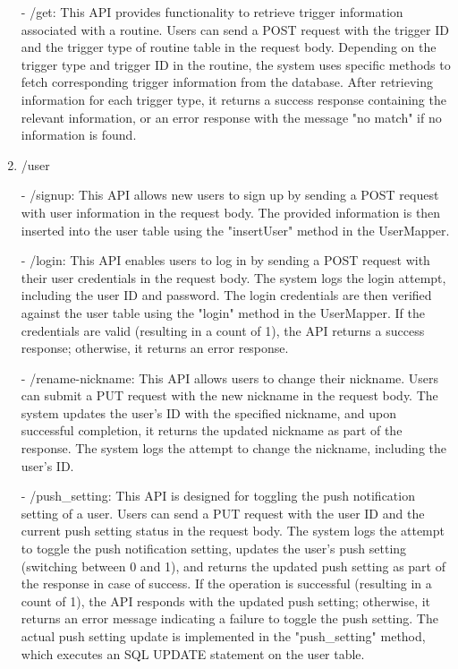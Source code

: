 \begin{enumerate}
                        \item[-] /get: This API provides functionality to retrieve trigger information associated with a routine. Users can send a POST request with the trigger ID and the trigger type of routine table in the request body. Depending on the trigger type and trigger ID in the routine, the system uses specific methods to fetch corresponding trigger information from the database. After retrieving information for each trigger type, it returns a success response containing the relevant information, or an error response with the message "no match" if no information is found.\\

                        \item /user
                        \item[-] /signup: This API allows new users to sign up by sending a POST request with user information in the request body. The provided information is then inserted into the user table using the "insertUser" method in the UserMapper.\\
                        \item[-] /login: This API enables users to log in by sending a POST request with their user credentials in the request body. The system logs the login attempt, including the user ID and password. The login credentials are then verified against the user table using the "login" method in the UserMapper. If the credentials are valid (resulting in a count of 1), the API returns a success response; otherwise, it returns an error response.\\
                        \item[-] /rename-nickname: This API allows users to change their nickname. Users can submit a PUT request with the new nickname in the request body. The system updates the user's ID with the specified nickname, and upon successful completion, it returns the updated nickname as part of the response. The system logs the attempt to change the nickname, including the user's ID.\\
                        \item[-] /push\_setting: This API is designed for toggling the push notification setting of a user. Users can send a PUT request with the user ID and the current push setting status in the request body. The system logs the attempt to toggle the push notification setting, updates the user's push setting (switching between 0 and 1), and returns the updated push setting as part of the response in case of success. If the operation is successful (resulting in a count of 1), the API responds with the updated push setting; otherwise, it returns an error message indicating a failure to toggle the push setting. The actual push setting update is implemented in the "push\_setting" method, which executes an SQL UPDATE statement on the user table.\\
                    \end{enumerate}